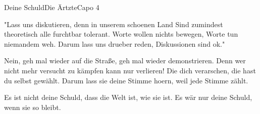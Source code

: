 \begin{song}{Deine Schuld}{Die Ärtzte}{Capo 4}

"Lass uns diskutieren, denn in unserem schoenen Land
Sind zumindest theoretisch alle furchtbar tolerant.
Worte wollen nichts bewegen, Worte tun niemandem weh.
Darum lass uns drueber reden, Diskussionen sind ok."

Nein, geh mal wieder auf die Straße, geh mal wieder demonstrieren.
Denn wer nicht mehr versucht zu kämpfen  kann nur verlieren!
Die dich verarschen, die hast du selbst gewählt.
Darum lass sie deine Stimme hoern, weil jede Stimme zählt.

Es ist nicht deine Schuld, dass die Welt ist, wie sie ist.
Es wär nur deine Schuld, wenn sie so bleibt.
\end{song}
